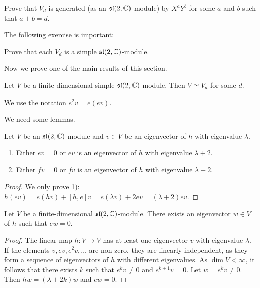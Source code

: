 \begin{exercise}
    Prove that $V_d$ is generated (as an $\mathfrak{sl}(2,\mathbb{C})$-module) by
    $X^aY^b$ for some $a$ and $b$ such that $a+b=d$. 
\end{exercise}

The following exercise is important:

\begin{exercise}
    Prove that each $V_d$ is a simple $\mathfrak{sl}(2,\mathbb{C})$-module.
\end{exercise}

Now we prove one of the main results of this section. 

\begin{theorem}
\label{thm:irreducibles_sl2}
    Let $V$ be a finite-dimensional 
    simple $\mathfrak{sl}(2,\mathbb{C})$-module. Then $V\simeq V_d$ for some $d$. 
\end{theorem}

We use the notation $e^2v=e(ev)$.

We need some lemmas. 

\begin{lemma}
    Let $V$ be an $\mathfrak{sl}(2,\mathbb{C})$-module and $v\in V$ be 
    an eigenvector of $h$ with eigenvalue $\lambda$. 
    \begin{enumerate}
        \item Either $ev=0$ or $ev$ is an eigenvector of $h$ with
            eigenvalue $\lambda+2$.
        \item Either $fv=0$ or $fv$ is an eigenvector of $h$ with
            eigenvalue $\lambda-2$.
    \end{enumerate} 
\end{lemma}

\begin{proof}
    We only prove 1): $h(ev)=e(hv)+[h,e]v=e(\lambda v)+2ev=(\lambda+2)ev$.
\end{proof}

\begin{lemma}
    Let $V$ be a finite-dimensional $\mathfrak{sl}(2,\mathbb{C})$-module.
    There exists an eigenvector 
    $w\in V$ of $h$ such that $ew=0$. 
\end{lemma}

\begin{proof}
    The linear map $h\colon V\to V$ has at least one eigenvector 
    $v$ with eigenvalue $\lambda$. If the elements 
    $v,ev,e^2v,\dots$ are non-zero, they are linearly independent, as they 
    form a sequence of eigenvectors of $h$ with different eigenvalues.  
    As $\dim V<\infty$, it follows that there exists $k$ 
    such that $e^kv\ne 0$ and $e^{k+1}v=0$. Let $w=e^kv\ne 0$. 
    Then
    $hw=(\lambda+2k)w$ and $ew=0$. 
\end{proof}

